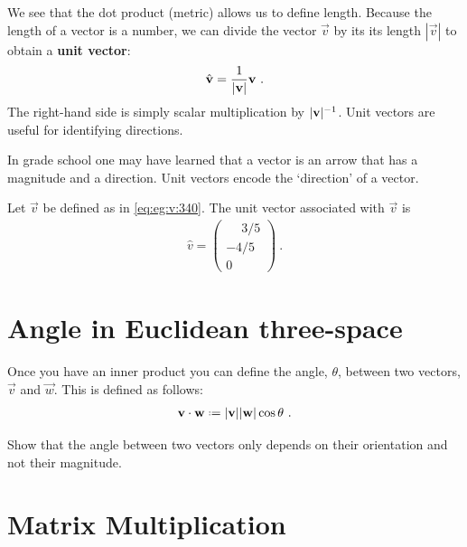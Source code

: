 \documentclass[12pt, oneside]{report}    %
\let\oldsection\section
\def\section{%
  \setcounter{sidenote}{1}%
  \oldsection
}
\begin{document}
We see that the dot product (metric) allows us to define length. Because the length of a vector is a number, we can divide the vector $\vec{v}$ by its its length $|\vec{v}|$ to obtain a \textbf{unit vector}:
\begin{align}
    {\hat{\mathbf{v}}} = \frac{1}{|\mathbf{v}|}\mathbf{v} \ .
    \label{eq:eg:v:340}
\end{align}
The right-hand side is simply scalar multiplication by $|\mathbf{v}|^{-1}$. Unit vectors are useful for identifying directions.

\begin{example}
In grade school one may have learned that a vector is an arrow that has a magnitude and a direction. Unit vectors encode the `direction' of a vector.
\end{example}

\begin{example}
Let $\vec{v}$ be defined as in \eqref{eq:eg:v:340}. The unit vector associated with $\vec{v}$ is
\begin{align}
    \hat{v} = 
    \begin{pmatrix}
        \phantom{+}3/5 \\
        -4/5\\
        0
    \end{pmatrix} \ .
\end{align}

\end{example}

\section{Angle in Euclidean three-space}
\label{sec:Euclidena:three:angle}

Once you have an inner product you can define the angle, $\theta$, between two vectors, $\vec{v}$ and $\vec{w}$. This is defined as follows:
\begin{align}
    \vec{v}\cdot\vec{w} \defeq |\vec{v}||\vec{w}| \cos\theta  \ .
    \label{eq:angle:between:3:vectors}
\end{align}
\begin{exercise}
Show that the angle between two vectors only depends on their orientation and not their magnitude. 
\end{exercise}


\section{Matrix Multiplication}
\label{sec:matrix:multiplication}
\end{document}
